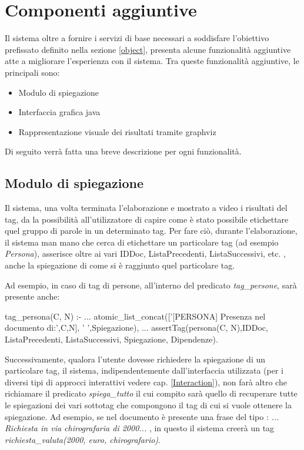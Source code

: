 
\section{Componenti aggiuntive}
Il sistema oltre a fornire i servizi di base necessari a soddisfare l'obiettivo prefissato definito nella sezione \ref{object}, presenta alcune funzionalità aggiuntive atte a migliorare l'esperienza con il sistema. Tra queste funzionalità aggiuntive, le principali sono:
\begin{itemize}
	\item Modulo di spiegazione
	\item Interfaccia grafica java
	\item Rappresentazione visuale dei risultati tramite graphviz
\end{itemize}
Di seguito verrà fatta una breve descrizione per ogni funzionalità.

\subsection{Modulo di spiegazione}
Il sistema, una volta terminata l'elaborazione e mostrato a video i risultati del tag, da la possibilità all'utilizzatore di capire come è stato possibile etichettare quel gruppo di parole in un determinato tag. Per fare ciò, durante l'elaborazione, il sistema man mano che cerca di etichettare un particolare tag (ad esempio \emph{Persona}), asserisce oltre ai vari IDDoc, ListaPrecedenti, ListaSuccessivi, etc. , anche la spiegazione di come si è raggiunto quel particolare tag.

Ad esempio, in caso di tag di persone, all'interno del predicato \emph{tag\_persone}, sarà presente anche:

\begin{prologcode}
 tag_persona(C, N) :-
   ...
   atomic_list_concat(['[PERSONA] Presenza nel documento di:',C,N],
                      ' ',Spiegazione),
   ...
   assertTag(persona(C, N),IDDoc, ListaPrecedenti, ListaSuccessivi,
            Spiegazione, Dipendenze).
\end{prologcode}

Successivamente, qualora l'utente dovesse richiedere la spiegazione di un particolare tag, il sistema, indipendentemente dall'interfaccia utilizzata (per i diversi tipi di approcci interattivi vedere cap. \ref{Interaction}), non farà altro che richiamare il predicato \emph{spiega\_tutto} il cui compito sarà quello di recuperare tutte le spiegazioni dei vari sottotag che compongono il tag di cui si vuole ottenere la spiegazione.
Ad esempio, se nel documento è presente una frase del tipo : \emph{... Richiesta in via chirografaria di 2000\officialeuro ...} , in questo il sistema creerà un tag \emph{richiesta\_valuta(2000, euro, chirografario)}.

